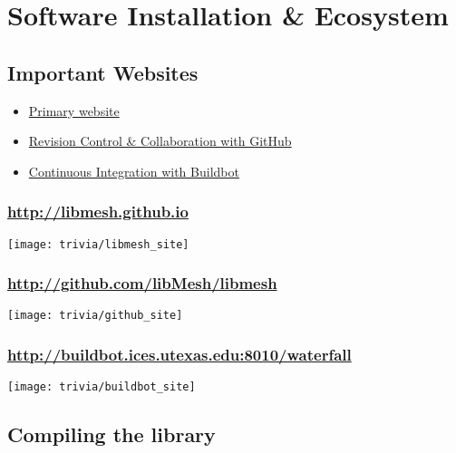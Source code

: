 \section{Software Installation \& Ecosystem}
\subsection{Important Websites}
\frame
{
  \Large
  \begin{block}{}
    \begin{itemize}
      \item \href{http://libmesh.github.io}{Primary website}
      \item \href{http://github.com/libMesh/libmesh}{Revision Control \& Collaboration with GitHub}
      \item \href{http://buildbot.ices.utexas.edu:8010/waterfall}{Continuous Integration with Buildbot}
    \end{itemize}
  \end{block}
}


\frame
{
\frametitle{\url{http://libmesh.github.io}}

\centerline{\texttt{[image: trivia/libmesh\_site]}}
}


\frame
{
\frametitle{\url{http://github.com/libMesh/libmesh}}

\centerline{\texttt{[image: trivia/github\_site]}}
}


\frame
{
\frametitle{\scriptsize \url{http://buildbot.ices.utexas.edu:8010/waterfall}}

\centerline{\texttt{[image: trivia/buildbot\_site]}}
}



\subsection{Compiling the library}
\frame
{
  \Large
  \begin{block}{}
  \end{block}
}


